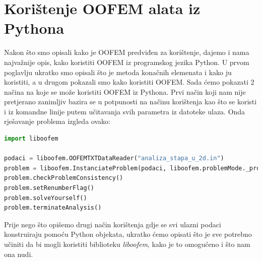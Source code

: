 \documentclass[a4paper,twoside,12pt]{memoir} %
\begin{document}



\section{Korištenje OOFEM alata iz Pythona}
\label{poglavlje:koristenje_pythona}
Nakon što smo opisali kako je OOFEM predviđen za korištenje, dajemo i nama najvažnije opis, kako koristiti OOFEM iz programskog jezika Python. U prvom poglavlju ukratko smo opisali što je metoda konačnih elemenata i kako ju koristiti, a u drugom pokazali smo kako koristiti OOFEM. Sada ćemo pokazati 2 načina na koje se može koristiti OOFEM iz Pythona. Prvi način koji nam nije pretjerano zanimljiv bazira se u potpunosti na načinu korištenja kao što se koristi i iz komandne linije putem učitavanja svih parametra iz datoteke ulaza. Onda rješavanje problema izgleda ovako:

\begin{lstlisting}[language=python, label={code:python_oofem_from_file}, caption={Pokretanje OOFEM alata pomoću Pythona i učitavanje ulaznih podataka iz datoteke}]
import liboofem

podaci = liboofem.OOFEMTXTDataReader("analiza_stapa_u_2d.in")
problem = liboofem.InstanciateProblem(podaci, liboofem.problemMode._processor, 0)
problem.checkProblemConsistency()
problem.setRenumberFlag()
problem.solveYourself()
problem.terminateAnalysis()
\end{lstlisting}

Prije nego što opišemo drugi način korištenja gdje se svi ulazni podaci konstruiraju pomoću Python objekata, ukratko ćemo opisati što je sve potrebno učiniti da bi mogli koristiti biblioteku \textit{liboofem}, kako je to omogućeno i što nam ona nudi. \par
\end{document}
